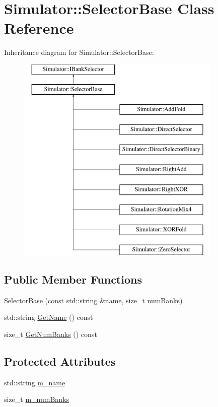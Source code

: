 \hypertarget{class_simulator_1_1_selector_base}{\section{Simulator\+:\+:Selector\+Base Class Reference}
\label{class_simulator_1_1_selector_base}
}
Inheritance diagram for Simulator\+:\+:Selector\+Base\+:\begin{figure}[H]
\begin{center}
\leavevmode
\includegraphics[height=10.000000cm]{class_simulator_1_1_selector_base}
\end{center}
\end{figure}
\subsection*{Public Member Functions}
\begin{DoxyCompactItemize}
\item 
\hyperlink{class_simulator_1_1_selector_base_a61ba56f3ae02a48ba8181299668e1700}{Selector\+Base} (const std\+::string \&\hyperlink{mtconf_8c_a8f8f80d37794cde9472343e4487ba3eb}{name}, size\+\_\+t num\+Banks)
\item 
std\+::string \hyperlink{class_simulator_1_1_selector_base_a4b629550677073368f8f6adf2217cb8c}{Get\+Name} () const 
\item 
size\+\_\+t \hyperlink{class_simulator_1_1_selector_base_ac12eca83b007d3a1b1b3c921e48f6d64}{Get\+Num\+Banks} () const 
\end{DoxyCompactItemize}
\subsection*{Protected Attributes}
\begin{DoxyCompactItemize}
\item 
std\+::string \hyperlink{class_simulator_1_1_selector_base_ab467a6b37614f1927e2baa53a91e5bff}{m\+\_\+name}
\item 
size\+\_\+t \hyperlink{class_simulator_1_1_selector_base_a7d214a13d5265ed875788886dc72ba18}{m\+\_\+num\+Banks}
\end{DoxyCompactItemize}

